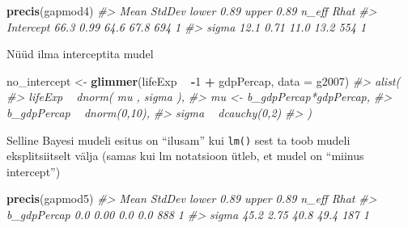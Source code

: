 \documentclass[]{book}
\newenvironment{Shaded}{\begin{snugshade}}{\end{snugshade}}
\newcommand{\KeywordTok}[1]{\textcolor[rgb]{0.13,0.29,0.53}{\textbf{#1}}}
\newcommand{\DataTypeTok}[1]{\textcolor[rgb]{0.13,0.29,0.53}{#1}}
\newcommand{\DecValTok}[1]{\textcolor[rgb]{0.00,0.00,0.81}{#1}}
\newcommand{\StringTok}[1]{\textcolor[rgb]{0.31,0.60,0.02}{#1}}
\newcommand{\CommentTok}[1]{\textcolor[rgb]{0.56,0.35,0.01}{\textit{#1}}}
\newcommand{\OperatorTok}[1]{\textcolor[rgb]{0.81,0.36,0.00}{\textbf{#1}}}
\newcommand{\NormalTok}[1]{#1}
\begin{document}
\begin{Shaded}
\end{Shaded}

\begin{Shaded}
\begin{Highlighting}[]
\KeywordTok{precis}\NormalTok{(gapmod4)}
\CommentTok{#>           Mean StdDev lower 0.89 upper 0.89 n_eff Rhat}
\CommentTok{#> Intercept 66.3   0.99       64.6       67.8   694    1}
\CommentTok{#> sigma     12.1   0.71       11.0       13.2   554    1}
\end{Highlighting}
\end{Shaded}

Nüüd ilma interceptita mudel

\begin{Shaded}
\begin{Highlighting}[]
\NormalTok{no_intercept <-}\StringTok{ }\KeywordTok{glimmer}\NormalTok{(lifeExp }\OperatorTok{~}\StringTok{ }\OperatorTok{-}\DecValTok{1} \OperatorTok{+}\StringTok{ }\NormalTok{gdpPercap, }\DataTypeTok{data =}\NormalTok{ g2007)}
\CommentTok{#> alist(}
\CommentTok{#>     lifeExp ~ dnorm( mu , sigma ),}
\CommentTok{#>     mu <- b_gdpPercap*gdpPercap,}
\CommentTok{#>     b_gdpPercap ~ dnorm(0,10),}
\CommentTok{#>     sigma ~ dcauchy(0,2)}
\CommentTok{#> )}
\end{Highlighting}
\end{Shaded}

Selline Bayesi mudeli esitus on ``ilusam'' kui \texttt{lm()} sest ta
toob mudeli eksplitsiitselt välja (samas kui lm notatsioon ütleb, et
mudel on ``miinus intercept'')

\begin{Shaded}
\end{Shaded}

\begin{Shaded}
\begin{Highlighting}[]
\KeywordTok{precis}\NormalTok{(gapmod5)}
\CommentTok{#>             Mean StdDev lower 0.89 upper 0.89 n_eff Rhat}
\CommentTok{#> b_gdpPercap  0.0   0.00        0.0        0.0   888    1}
\CommentTok{#> sigma       45.2   2.75       40.8       49.4   187    1}
\end{Highlighting}
\end{Shaded}
\end{document}
